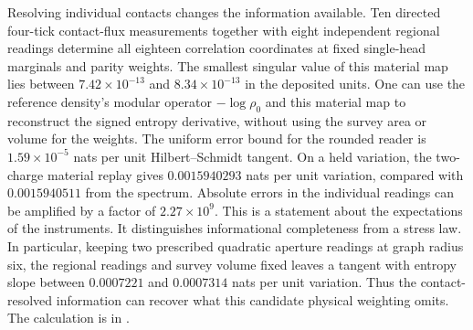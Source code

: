 \documentclass[11pt]{article}
\begin{document}
Resolving individual contacts changes the information available. Ten
directed four-tick contact-flux measurements together with eight
independent regional readings determine all eighteen correlation
coordinates at fixed single-head marginals and parity weights.
The smallest singular value of this material map lies between
$7.42\times10^{-13}$ and $8.34\times10^{-13}$ in the deposited units.
One can use the reference density's modular operator $-\log\rho_0$
and this material map to reconstruct the signed entropy derivative,
without using the survey area or volume for the weights. The uniform
error bound for the rounded reader is $1.59\times10^{-5}$ nats per
unit Hilbert--Schmidt tangent. On a held variation, the two-charge
material replay gives $0.0015940293$ nats per unit variation, compared
with $0.0015940511$ from the spectrum. Absolute errors in the individual
readings can be amplified by a factor of $2.27\times10^9$.
This is a statement about the expectations of the instruments.
It distinguishes informational completeness from a stress law.
In particular, keeping two prescribed quadratic aperture readings
at graph radius six, the regional readings and survey volume fixed
leaves a tangent with entropy slope between $0.0007221$ and $0.0007314$
nats per unit variation. Thus the contact-resolved information can
recover what this candidate physical weighting omits. The calculation
is in .
\end{document}
